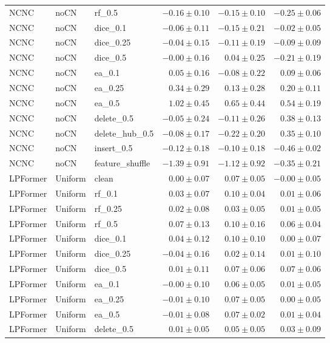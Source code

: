 \documentclass[UTF8,a4paper,11pt,fontset=fandol]{ctexart}
\begin{document}
{\begin{longtable}{lllrrr}
NCNC & noCN & rf\_0.5 & $-0.16\pm0.10$ & $-0.15\pm0.10$ & $-0.25\pm0.06$ \\
NCNC & noCN & dice\_0.1 & $-0.06\pm0.11$ & $-0.15\pm0.21$ & $-0.02\pm0.05$ \\
NCNC & noCN & dice\_0.25 & $-0.04\pm0.15$ & $-0.11\pm0.19$ & $-0.09\pm0.09$ \\
NCNC & noCN & dice\_0.5 & $-0.00\pm0.16$ & $0.04\pm0.25$ & $-0.21\pm0.19$ \\
NCNC & noCN & ea\_0.1 & $0.05\pm0.16$ & $-0.08\pm0.22$ & $0.09\pm0.06$ \\
NCNC & noCN & ea\_0.25 & $0.34\pm0.29$ & $0.13\pm0.28$ & $0.20\pm0.11$ \\
NCNC & noCN & ea\_0.5 & $1.02\pm0.45$ & $0.65\pm0.44$ & $0.54\pm0.19$ \\
NCNC & noCN & delete\_0.5 & $-0.05\pm0.24$ & $-0.11\pm0.26$ & $0.38\pm0.13$ \\
NCNC & noCN & delete\_hub\_0.5 & $-0.08\pm0.17$ & $-0.22\pm0.20$ & $0.35\pm0.10$ \\
NCNC & noCN & insert\_0.5 & $-0.12\pm0.18$ & $-0.10\pm0.18$ & $-0.46\pm0.02$ \\
NCNC & noCN & feature\_shuffle & $-1.39\pm0.91$ & $-1.12\pm0.92$ & $-0.35\pm0.21$ \\
LPFormer & Uniform & clean & $0.00\pm0.07$ & $0.07\pm0.05$ & $-0.00\pm0.05$ \\
LPFormer & Uniform & rf\_0.1 & $0.03\pm0.07$ & $0.10\pm0.04$ & $0.01\pm0.06$ \\
LPFormer & Uniform & rf\_0.25 & $0.02\pm0.08$ & $0.03\pm0.05$ & $0.01\pm0.05$ \\
LPFormer & Uniform & rf\_0.5 & $0.07\pm0.13$ & $0.10\pm0.16$ & $0.06\pm0.04$ \\
LPFormer & Uniform & dice\_0.1 & $0.04\pm0.12$ & $0.10\pm0.10$ & $0.00\pm0.07$ \\
LPFormer & Uniform & dice\_0.25 & $-0.04\pm0.16$ & $0.02\pm0.14$ & $0.01\pm0.10$ \\
LPFormer & Uniform & dice\_0.5 & $0.01\pm0.11$ & $0.07\pm0.06$ & $0.07\pm0.06$ \\
LPFormer & Uniform & ea\_0.1 & $-0.00\pm0.10$ & $0.06\pm0.05$ & $0.01\pm0.05$ \\
LPFormer & Uniform & ea\_0.25 & $-0.01\pm0.10$ & $0.07\pm0.05$ & $0.00\pm0.05$ \\
LPFormer & Uniform & ea\_0.5 & $-0.01\pm0.08$ & $0.07\pm0.02$ & $0.01\pm0.04$ \\
LPFormer & Uniform & delete\_0.5 & $0.01\pm0.05$ & $0.05\pm0.05$ & $0.03\pm0.09$ \\

\end{longtable}}
\end{document}
